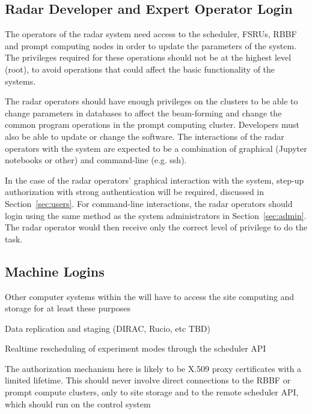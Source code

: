 \documentclass[12pt,a4paper]{article}
\begin{document}
\subsection{Radar Developer and Expert Operator Login}
\label{sec:operator}
The operators of the radar system need access to the scheduler, FSRUs, RBBF and prompt computing nodes in order to update the parameters of the system.  The privileges required for these operations should not be at the highest level (root), to avoid operations that could affect the basic functionality of the systems.

The radar operators should have enough privileges on the clusters to be able to change parameters in databases to affect the beam-forming and change the common program operations in the prompt computing cluster.
Developers must also be able to update or change the software.
The interactions of the radar operators  with the system are expected to be a combination of graphical (Jupyter notebooks or other) and command-line (e.g. ssh).

In the case of the radar operators' graphical interaction with the system, step-up authorization with strong authentication will be required, discussed in Section~\ref{sec:users}.
For command-line interactions, the radar operators should login using the same method as the system administrators in Section~\ref{sec:admin}.
The radar operator would then receive only the correct level of privilege to do the task.

\subsection{Machine Logins}

Other computer systems within the \ED \einfra will have to access the site computing and storage for at least these purposes
\bitm
\item Data replication and staging (DIRAC, Rucio, etc TBD) 
\item Realtime rescheduling of experiment modes through the scheduler API 
\eitm

The authorization mechanism here is likely to be X.509 proxy certificates with a limited lifetime.
This should never involve direct connections to the RBBF or prompt compute clusters, only to site storage and to the remote scheduler API, which should run on the control system 
\end{document}
